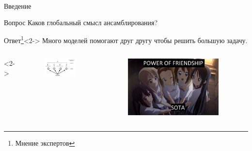 \documentclass[9pt]{beamer}
\begin{document}
\begin{frame}{Введение}

    \begin{block}{Вопрос}
        Каков глобальный смысл ансамблирования?
    \end{block}

    \begin{block}{Ответ\footnote{Мнение экспертов}}<2->
        Много моделей помогают друг другу чтобы решить большую задачу.
    \end{block}

    \begin{columns}<2->
        \begin{column}{0.5\textwidth}
            \begin{figure}
                \centering
                \includegraphics[width=0.9\textwidth]{images/image2.png}
            \end{figure}
        \end{column}
        \begin{column}{0.5\textwidth}
            \begin{figure}
                \centering
                \includegraphics[width=0.9\textwidth]{images/image1.jpg}
            \end{figure}
        \end{column}
    \end{columns}
\end{frame}
\end{document}
